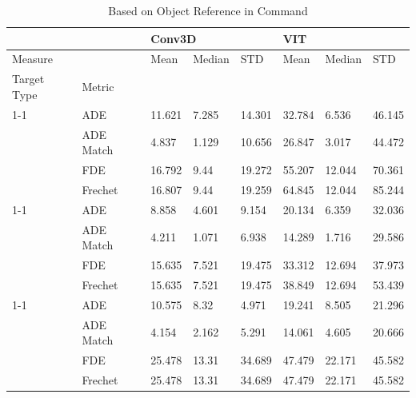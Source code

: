 \documentclass[11pt]{article}
\begin{document}
\begin{table}
{
    \centering
    \begin{tabular*}{\textwidth}{@{}llllllll@{}}
    \toprule
    \multicolumn{2}{l}{}                                                 & \multicolumn{3}{l}{Conv3D} & \multicolumn{3}{l}{VIT}  \\ \midrule
    \multicolumn{2}{l}{Measure}                                          & Mean    & Median  & STD    & Mean   & Median & STD    \\
    \multicolumn{1}{l|}{Target Type}                         & Metric    &         &         &        &        &        &        \\ \cline{1-1}
    \multicolumn{1}{l|}{\multirow{4}{*}{infrastructure}}     & ADE       & 11.621  & 7.285   & 14.301 & 32.784 & 6.536  & 46.145 \\ 
    \multicolumn{1}{l|}{}                                    & ADE Match & 4.837   & 1.129   & 10.656 & 26.847 & 3.017  & 44.472 \\
    \multicolumn{1}{l|}{}                                    & FDE       & 16.792  & 9.44    & 19.272 & 55.207 & 12.044 & 70.361 \\
    \multicolumn{1}{l|}{}                                    & Frechet   & 16.807  & 9.44    & 19.259 & 64.845 & 12.044 & 85.244 \\ \cline{1-1}
    \multicolumn{1}{l|}{\multirow{4}{*}{road/traffic light}} & ADE       & 8.858   & 4.601   & 9.154  & 20.134 & 6.359  & 32.036 \\
    \multicolumn{1}{l|}{}                                    & ADE Match & 4.211   & 1.071   & 6.938  & 14.289 & 1.716  & 29.586 \\
    \multicolumn{1}{l|}{}                                    & FDE       & 15.635  & 7.521   & 19.475 & 33.312 & 12.694 & 37.973 \\
    \multicolumn{1}{l|}{}                                    & Frechet   & 15.635  & 7.521   & 19.475 & 38.849 & 12.694 & 53.439 \\ \cline{1-1}
    \multicolumn{1}{l|}{\multirow{4}{*}{automobile}}         & ADE       & 10.575  & 8.32    & 4.971  & 19.241 & 8.505  & 21.296 \\
    \multicolumn{1}{l|}{}                                    & ADE Match & 4.154   & 2.162   & 5.291  & 14.061 & 4.605  & 20.666 \\
    \multicolumn{1}{l|}{}                                    & FDE       & 25.478  & 13.31   & 34.689 & 47.479 & 22.171 & 45.582 \\
    \multicolumn{1}{l|}{}                                    & Frechet   & 25.478  & 13.31   & 34.689 & 47.479 & 22.171 & 45.582 \\ \bottomrule 
    \end{tabular*}
}
    \caption{Based on Object Reference in Command}
    \label{fig:ablations_3}
\end{table}
\end{document}
